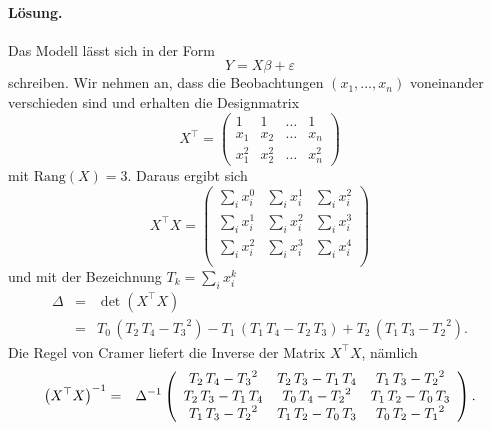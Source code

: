 \paragraph*{Lösung. } Das Modell lässt sich in der Form
\begin{equation}
    Y = X \beta + \varepsilon
\end{equation}
schreiben. Wir nehmen an, dass die Beobachtungen $\left( x_1,\ldots, x_n \right)$ 
voneinander verschieden sind und erhalten die Designmatrix
\begin{equation}
    X^\top = \left(
    \begin{array}{cccc}
        1       & 1     & \ldots & 1 \\
        x_1     & x_2   & \ldots & x_n \\
        x_1^2   & x_2^2 & \ldots & x_n^2
    \end{array}
    \right)
\end{equation} 
mit $\textrm{Rang}(X) = 3$. Daraus ergibt sich
\begin{equation}
    X^\top X = \left(
    \begin{array}{ccc}
        \sum_{i}^{} x_i^0 & \sum_{i}^{} x_i^1 & \sum_{i}^{} x_i^2 \\
        \sum_{i}^{} x_i^1 & \sum_{i}^{} x_i^2 & \sum_{i}^{} x_i^3 \\
        \sum_{i}^{} x_i^2 & \sum_{i}^{} x_i^3 & \sum_{i}^{} x_i^4 \\
    \end{array}
    \right)
\end{equation}
und mit der Bezeichnung $T_k = \sum_{i}^{} x_i^k$ 
\begin{eqnarray}
    \Delta &=&  \det \left( X^\top X \right) \\
    &=& { T_0}\,\left({ T_2}\,{ T_4}-{ T_3}^2\right)-{ T_1}\,\left({ T_1}\,{ T_4}-{ T_2}\,{ T_3}\right)+{ T_2}\,\left({ T_1}\,{ T_3}-{ T_2}^2\right).
\end{eqnarray}
Die Regel von Cramer liefert die Inverse der Matrix $X^\top X$, nämlich
\begin{eqnarray}
    \left( X^\top X \right)^{-1} &=& \Delta^{-1} \left(
    \begin{array}{ccc}
{ T_2}\,{ T_4}-{ T_3}^2&{ T_2}\,{ T_3}-
 { T_1}\,{ T_4}&{ T_1}\,{ T_3}-{ T_2}^2\cr { T_2}\,
 { T_3}-{ T_1}\,{ T_4}&{ T_0}\,{ T_4}-{ T_2}^2&
 { T_1}\,{ T_2}-{ T_0}\,{ T_3}\cr { T_1}\,{ T_3}-
 { T_2}^2&{ T_1}\,{ T_2}-{ T_0}\,{ T_3}&{ T_0}\,
 { T_2}-{ T_1}^2
    \end{array}
    \right). 
\end{eqnarray}
